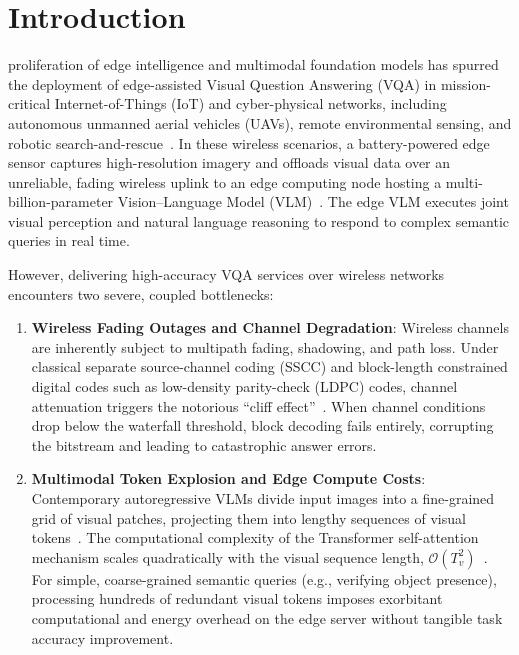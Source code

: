 \section{Introduction}\label{sec:intro}

 proliferation of edge intelligence and multimodal foundation models has spurred the deployment of edge-assisted Visual Question Answering (VQA) in mission-critical Internet-of-Things (IoT) and cyber-physical networks, including autonomous unmanned aerial vehicles (UAVs), remote environmental sensing, and robotic search-and-rescue~\cite{lobry2020rsvqa,zheng2024aerialee}. In these wireless scenarios, a battery-powered edge sensor captures high-resolution imagery and offloads visual data over an unreliable, fading wireless uplink to an edge computing node hosting a multi-billion-parameter Vision--Language Model (VLM)~\cite{wang2024qwen2vl,bai2025qwen25vl}. The edge VLM executes joint visual perception and natural language reasoning to respond to complex semantic queries in real time.

However, delivering high-accuracy VQA services over wireless networks encounters two severe, coupled bottlenecks:
\begin{enumerate}
    \item \textbf{Wireless Fading Outages and Channel Degradation}: Wireless channels are inherently subject to multipath fading, shadowing, and path loss. Under classical separate source-channel coding (SSCC) and block-length constrained digital codes such as low-density parity-check (LDPC) codes, channel attenuation triggers the notorious ``cliff effect''~\cite{bourtsoulatze2019djscc}. When channel conditions drop below the waterfall threshold, block decoding fails entirely, corrupting the bitstream and leading to catastrophic answer errors.
    \item \textbf{Multimodal Token Explosion and Edge Compute Costs}: Contemporary autoregressive VLMs divide input images into a fine-grained grid of visual patches, projecting them into lengthy sequences of visual tokens~\cite{wang2024qwen2vl}. The computational complexity of the Transformer self-attention mechanism scales quadratically with the visual sequence length, $\mathcal{O}(T_v^2)$~\cite{sabanovic2026inarvl}. For simple, coarse-grained semantic queries (e.g., verifying object presence), processing hundreds of redundant visual tokens imposes exorbitant computational and energy overhead on the edge server without tangible task accuracy improvement.
\end{enumerate}

